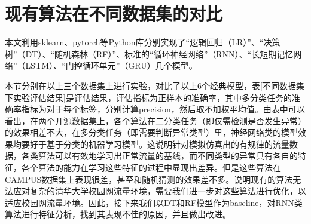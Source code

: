 




\section{现有算法在不同数据集的对比}
本文利用sklearn、pytorch等Python库分别实现了“逻辑回归（LR）”、“决策树”（DT）、“随机森林（RF）”、标准的“循环神经网络”（RNN）、“长短期记忆网络”（LSTM）、“门控循环单元”（GRU）几个模型。

本节分别在以上三个数据集上进行实验，对比了以上6个经典模型，表\ref{不同数据集下实验评估结果}是评估结果，评估指标为正样本的准确率，其中多分类任务的准确率指标为对于每个标签，分别计算precision，然后取不加权平均值。由表中可以看出，在两个开源数据集上，各个算法在二分类任务（即仅需检测是否发生异常）的效果相差不大，在多分类任务（即需要判断异常类型）里，神经网络类的模型效果均要好于基于分类的机器学习模型。这说明针对模拟仿真出的有规律的流量数据，各类算法可以有效地学习出正常流量的基线，而不同类型的异常具有各自的特征，各个算法的能力在学习这些特征的过程中显现出差异。但是这些算法在CAMPUS数据集上表现很差，甚至和随机猜测的效果差不多。说明现有的算法无法应对复杂的清华大学校园网流量环境，需要我们进一步对这些算法进行优化，以适应校园网流量环境。因此，接下来我们以DT和RF模型作为baseline，对RNN类算法进行特征分析，找到其表现不佳的原因，并且做出改进。




